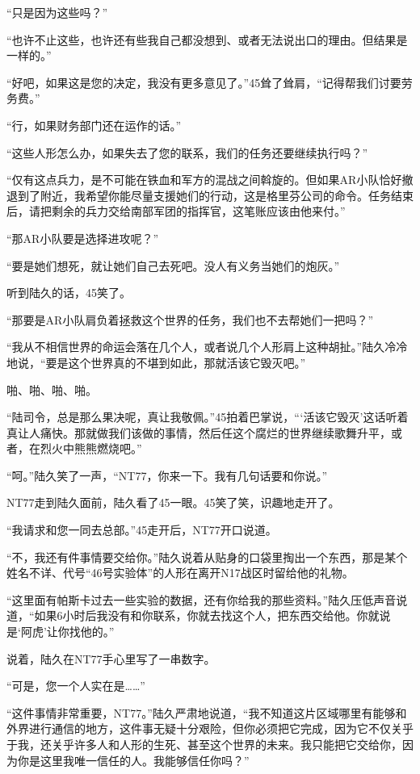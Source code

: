 “只是因为这些吗？”

“也许不止这些，也许还有些我自己都没想到、或者无法说出口的理由。但结果是一样的。”

“好吧，如果这是您的决定，我没有更多意见了。”45耸了耸肩，“记得帮我们讨要劳务费。”

“行，如果财务部门还在运作的话。”

“这些人形怎么办，如果失去了您的联系，我们的任务还要继续执行吗？”

“仅有这点兵力，是不可能在铁血和军方的混战之间斡旋的。但如果AR小队恰好撤退到了附近，我希望你能尽量支援她们的行动，这是格里芬公司的命令。任务结束后，请把剩余的兵力交给南部军团的指挥官，这笔账应该由他来付。”

“那AR小队要是选择进攻呢？”

“要是她们想死，就让她们自己去死吧。没人有义务当她们的炮灰。”

听到陆久的话，45笑了。

“那要是AR小队肩负着拯救这个世界的任务，我们也不去帮她们一把吗？”

“我从不相信世界的命运会落在几个人，或者说几个人形肩上这种胡扯。”陆久冷冷地说，“要是这个世界真的不堪到如此，那就活该它毁灭吧。”

啪、啪、啪、啪。

“陆司令，总是那么果决呢，真让我敬佩。”45拍着巴掌说，“‘活该它毁灭’这话听着真让人痛快。那就做我们该做的事情，然后任这个腐烂的世界继续歌舞升平，或者，在烈火中熊熊燃烧吧。”

“呵。”陆久笑了一声，“NT77，你来一下。我有几句话要和你说。”

NT77走到陆久面前，陆久看了45一眼。45笑了笑，识趣地走开了。

“我请求和您一同去总部。”45走开后，NT77开口说道。

“不，我还有件事情要交给你。”陆久说着从贴身的口袋里掏出一个东西，那是某个姓名不详、代号“46号实验体”的人形在离开N17战区时留给他的礼物。

“这里面有帕斯卡过去一些实验的数据，还有你给我的那些资料。”陆久压低声音说道，“如果6小时后我没有和你联系，你就去找这个人，把东西交给他。你就说是‘阿虎’让你找他的。”

说着，陆久在NT77手心里写了一串数字。

“可是，您一个人实在是……”

“这件事情非常重要，NT77。”陆久严肃地说道，“我不知道这片区域哪里有能够和外界进行通信的地方，这件事无疑十分艰险，但你必须把它完成，因为它不仅关乎于我，还关乎许多人和人形的生死、甚至这个世界的未来。我只能把它交给你，因为你是这里我唯一信任的人。我能够信任你吗？”

